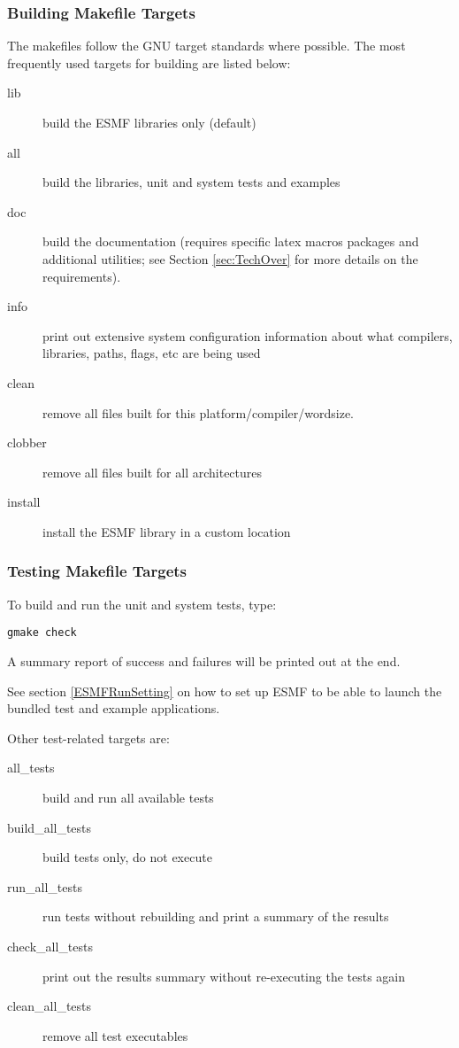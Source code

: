 \subsubsection{Building Makefile Targets}

The makefiles follow the GNU target standards where possible.
The most frequently used targets for building are listed below:
\begin{description}
\item[lib] build the ESMF libraries only (default)
\item[all] build the libraries, unit and system tests and examples
\item[doc] build the documentation (requires specific latex macros packages
and additional utilities; see Section \ref{sec:TechOver} for more details
on the requirements).  
\item[info] print out extensive system configuration information about what
           compilers, libraries, paths, flags, etc are being used
\item[clean] remove all files built for this platform/compiler/wordsize.
\item[clobber] remove all files built for all architectures
\item[install] install the ESMF library in a custom location
\end{description}


\subsubsection{Testing Makefile Targets}

To build and run the unit and system tests, type:
\begin{verbatim}
gmake check
\end{verbatim}
A summary report of success and failures will be printed out at the end.

See section \ref{ESMFRunSetting} on how to set up ESMF to be able to launch
the bundled test and example applications.

\noindent Other test-related targets are:
\begin{description}
\item[all\_tests] build and run all available tests
\item[build\_all\_tests] build tests only, do not execute
\item[run\_all\_tests] run tests without rebuilding and print a
summary of the results
\item[check\_all\_tests] 
print out the results summary without re-executing the tests again
\item[clean\_all\_tests] remove all test executables 
\end{description}

